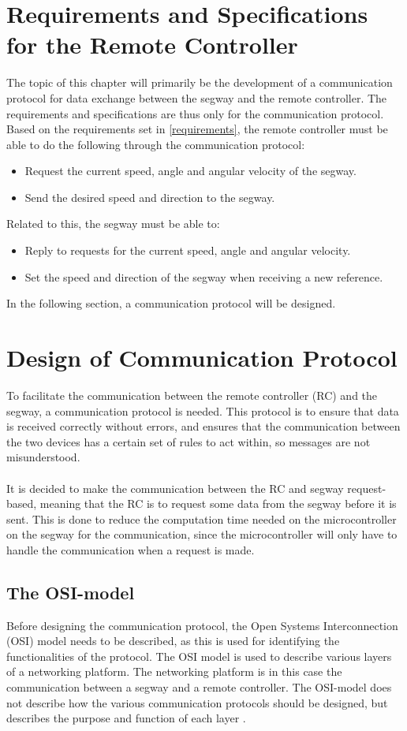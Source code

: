 \section{Requirements and Specifications for the Remote Controller}

The topic of this chapter will primarily be the development of a communication protocol for data exchange between the segway and the remote controller. The requirements and specifications are thus only for the communication protocol. Based on the requirements set in \autoref{requirements}, the remote controller must be able to do the following through the communication protocol:
\begin{itemize}
\item Request the current speed, angle and angular velocity of the segway.
\item Send the desired speed and direction to the segway.
\end{itemize}

Related to this, the segway must be able to:
\begin{itemize}
\item Reply to requests for the current speed, angle and angular velocity.
\item Set the speed and direction of the segway when receiving a new reference.
\end{itemize}
In the following section, a communication protocol will be designed.

\section{Design of Communication Protocol}
To facilitate the communication between the remote controller (RC) and the segway, a communication protocol is needed. This protocol is to ensure that data is received correctly without errors, and ensures that the communication between the two devices has a certain set of rules to act within, so messages are not misunderstood.\\\\
It is decided to make the communication between the RC and segway request-based, meaning that the RC is to request some data from the segway before it is sent. This is done to reduce the computation time needed on the microcontroller on the segway for the communication, since the microcontroller  will only have to handle the communication when a request is made.
\subsection{The OSI-model}
Before designing the communication protocol, the Open Systems Interconnection (OSI) model needs to be described, as this is used for identifying the functionalities of the protocol.
The OSI model is used to describe various layers of a networking platform. The networking platform is in this case the communication between a segway and a remote controller. The OSI-model does not describe how the various communication protocols should be designed, but describes the purpose and function of each layer \citep{tanenbaum}.

